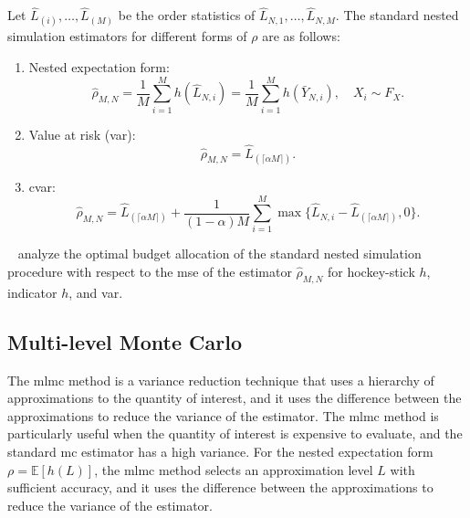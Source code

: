 Let $\hat{L}_{(i)}, \dots, \hat{L}_{(M)}$ be the order statistics of $\hat{L}_{N, 1}, \dots, \hat{L}_{N, M}$. 
The standard nested simulation estimators for different forms of $\rho$ are as follows:

\begin{enumerate}
    \item   Nested expectation form:
            \begin{equation*}
                \hat{\rho}_{M, N} = \frac{1}{M} \sum_{i=1}^M h(\hat{L}_{N, i}) = \frac{1}{M} \sum_{i=1}^M h(\bar{Y}_{N, i}), \quad X_i \sim F_X.
            \end{equation*}
    \item   Value at risk (\gls{var}):
            \begin{equation*}
                \hat{\rho}_{M, N} = \hat{L}_{(\lceil \alpha M \rceil)}.
            \end{equation*}

    \item   \gls{cvar}:
            \begin{equation}\label{eq1:cvar-hat}
                \hat{\rho}_{M, N} = \hat{L}_{(\lceil \alpha M \rceil)} + \frac{1}{(1-\alpha) M} \sum_{i=1}^M \max \{\hat{L}_{N, i} - \hat{L}_{(\lceil \alpha M \rceil)}, 0 \}.
            \end{equation}
\end{enumerate}

~\cite{gordy2010nested} analyze the optimal budget allocation of the standard nested simulation procedure with respect to the \gls{mse} of the estimator $\hat{\rho}_{M, N}$ for hockey-stick $h$, indicator $h$, and \gls{var}.

\subsection{Multi-level Monte Carlo}

The \gls{mlmc} method is a variance reduction technique that uses a hierarchy of approximations to the quantity of interest, and it uses the difference between the approximations to reduce the variance of the estimator.
The \gls{mlmc} method is particularly useful when the quantity of interest is expensive to evaluate, and the standard \gls{mc} estimator has a high variance.
For the nested expectation form $\rho = \mathbb{E}[h(L)]$, the \gls{mlmc} method selects an approximation level $L$ with sufficient accuracy, and it uses the difference between the approximations to reduce the variance of the estimator.

